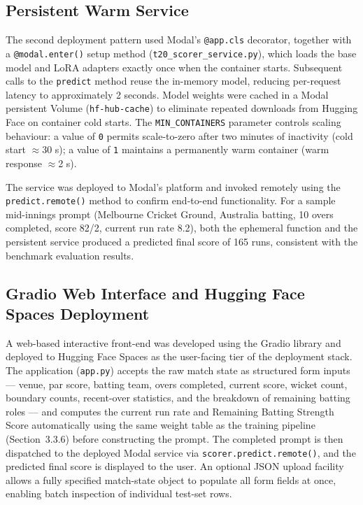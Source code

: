 \subsection{Persistent Warm Service}

The second deployment pattern used Modal's \texttt{@app.cls} decorator, together with a \texttt{@modal.enter()} setup method (\texttt{t20\_scorer\_service.py}), which loads the base model and LoRA adapters exactly once when the container starts. Subsequent calls to the \texttt{predict} method reuse the in-memory model, reducing per-request latency to approximately 2 seconds. Model weights were cached in a Modal persistent Volume (\texttt{hf-hub-cache}) to eliminate repeated downloads from Hugging Face on container cold starts. The \texttt{MIN\_CONTAINERS} parameter controls scaling behaviour: a value of \texttt{0} permits scale-to-zero after two minutes of inactivity (cold start $\approx$30 s); a value of \texttt{1} maintains a permanently warm container (warm response $\approx$2 s).

The service was deployed to Modal's platform and invoked remotely using the \texttt{predict.remote()} method to confirm end-to-end functionality. For a sample mid-innings prompt (Melbourne Cricket Ground, Australia batting, 10 overs completed, score 82/2, current run rate 8.2), both the ephemeral function and the persistent service produced a predicted final score of 165 runs, consistent with the benchmark evaluation results.

\subsection{Gradio Web Interface and Hugging Face Spaces Deployment}

A web-based interactive front-end was developed using the Gradio library \cite{abid2019gradio} and deployed to Hugging Face Spaces \cite{hfspaces2024} as the user-facing tier of the deployment stack. The application (\texttt{app.py}) accepts the raw match state as structured form inputs --- venue, par score, batting team, overs completed, current score, wicket count, boundary counts, recent-over statistics, and the breakdown of remaining batting roles --- and computes the current run rate and Remaining Batting Strength Score automatically using the same weight table as the training pipeline (Section~3.3.6) before constructing the prompt. The completed prompt is then dispatched to the deployed Modal service via \texttt{scorer.predict.remote()}, and the predicted final score is displayed to the user. An optional JSON upload facility allows a fully specified match-state object to populate all form fields at once, enabling batch inspection of individual test-set rows.

